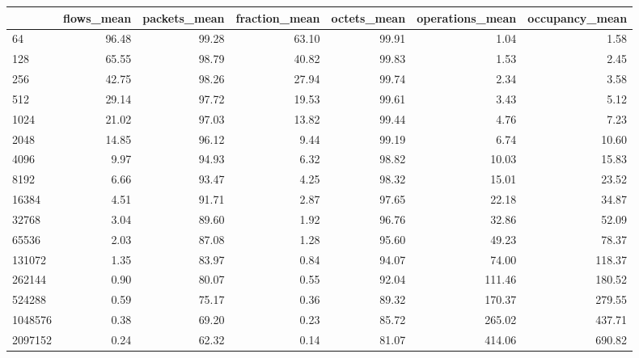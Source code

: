 \begin{tabular}{lrrrrrr}
\toprule
{} &  flows\_mean &  packets\_mean &  fraction\_mean &  octets\_mean &  operations\_mean &  occupancy\_mean \\
\midrule
64         &       96.48 &         99.28 &          63.10 &        99.91 &             1.04 &            1.58 \\
128        &       65.55 &         98.79 &          40.82 &        99.83 &             1.53 &            2.45 \\
256        &       42.75 &         98.26 &          27.94 &        99.74 &             2.34 &            3.58 \\
512        &       29.14 &         97.72 &          19.53 &        99.61 &             3.43 &            5.12 \\
1024       &       21.02 &         97.03 &          13.82 &        99.44 &             4.76 &            7.23 \\
2048       &       14.85 &         96.12 &           9.44 &        99.19 &             6.74 &           10.60 \\
4096       &        9.97 &         94.93 &           6.32 &        98.82 &            10.03 &           15.83 \\
8192       &        6.66 &         93.47 &           4.25 &        98.32 &            15.01 &           23.52 \\
16384      &        4.51 &         91.71 &           2.87 &        97.65 &            22.18 &           34.87 \\
32768      &        3.04 &         89.60 &           1.92 &        96.76 &            32.86 &           52.09 \\
65536      &        2.03 &         87.08 &           1.28 &        95.60 &            49.23 &           78.37 \\
131072     &        1.35 &         83.97 &           0.84 &        94.07 &            74.00 &          118.37 \\
262144     &        0.90 &         80.07 &           0.55 &        92.04 &           111.46 &          180.52 \\
524288     &        0.59 &         75.17 &           0.36 &        89.32 &           170.37 &          279.55 \\
1048576    &        0.38 &         69.20 &           0.23 &        85.72 &           265.02 &          437.71 \\
2097152    &        0.24 &         62.32 &           0.14 &        81.07 &           414.06 &          690.82 \\

\end{tabular}
